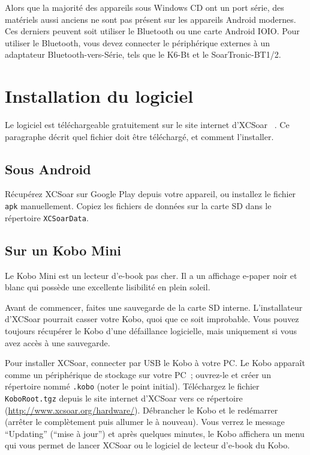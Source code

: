 Alors que la majorité des appareils sous Windows CD ont un port série, des matériels
aussi anciens ne sont pas présent sur les appareils Android modernes. Ces derniers peuvent soit
utiliser le Bluetooth ou une carte Android IOIO. Pour utiliser le Bluetooth, vous devez
connecter le périphérique externes à un adaptateur Bluetooth-vers-Série, tels
que le K6-Bt et le SoarTronic-BT1/2.

\section{Installation du logiciel}

Le logiciel est téléchargeable gratuitement sur le site internet d'XCSoar ~\xcsoarwebsite{}. Ce paragraphe décrit quel fichier doit être téléchargé, et comment l'installer.

\subsection*{Sous Android}

Récupérez XCSoar sur Google Play depuis votre appareil, ou installez le fichier \verb|apk|
manuellement. Copiez les fichiers de données sur la carte SD dans le répertoire \verb|XCSoarData|.

\subsection*{Sur un Kobo Mini}

Le Kobo Mini est un lecteur d'e-book pas cher. Il a un affichage
e-paper noir et blanc qui possède une excellente lisibilité en plein soleil.

Avant de commencer, faites une sauvegarde de la carte SD interne. L'installateur d'XCSoar
pourrait casser votre Kobo, quoi que ce soit improbable. Vous pouvez toujours récupérer le Kobo
d'une défaillance logicielle, mais uniquement si vous avez accès à une sauvegarde.

Pour installer XCSoar, connecter par USB le Kobo à votre PC. Le Kobo 
apparaît comme un périphérique de stockage sur votre PC~; ouvrez-le et créer un
répertoire nommé \texttt{.kobo} (noter le point initial). Téléchargez le 
fichier \texttt{KoboRoot.tgz} depuis le site internet d'XCSoar vers ce
répertoire (\url{http://www.xcsoar.org/hardware/}). Débrancher le Kobo et le redémarrer (arrêter le complètement
puis allumer le à nouveau). Vous verrez le message ``Updating'' (``mise à jour'') et
après quelques minutes, le Kobo affichera un menu qui vous permet de lancer
XCSoar ou le logiciel de lecteur d'\mbox{e-book} du Kobo.

